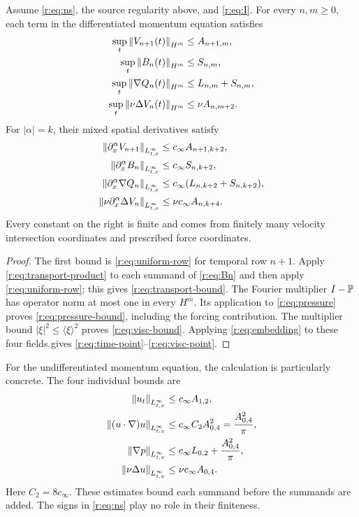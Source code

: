 \begin{theorem}\label{r:thm:individual}
Assume \eqref{r:eq:ns}, the source regularity above, and \eqref{r:eq:I}.
For every \(n,m\ge0\), each term in the differentiated momentum equation
satisfies
\begin{align}
 \sup_t\left\lVert V_{n+1}(t)\right\rVert_{H^m}&\le A_{n+1,m},\label{r:eq:time-bound}\\
 \sup_t\left\lVert B_n(t)\right\rVert_{H^m}&\le S_{n,m},\label{r:eq:transport-bound}\\
 \sup_t\left\lVert \nabla Q_n(t)\right\rVert_{H^m}&\le L_{n,m}+S_{n,m},\label{r:eq:pressure-bound}\\
 \sup_t\left\lVert \nu\Delta V_n(t)\right\rVert_{H^m}&\le\nu A_{n,m+2}.\label{r:eq:visc-bound}
\end{align}
For \(|\alpha|=k\), their mixed spatial derivatives satisfy
\begin{align}
 \left\lVert \partial_x^\alpha V_{n+1}\right\rVert_{L^\infty_{t,x}}
 &\le c_\infty A_{n+1,k+2},\label{r:eq:time-point}\\
 \left\lVert \partial_x^\alpha B_n\right\rVert_{L^\infty_{t,x}}
 &\le c_\infty S_{n,k+2},\label{r:eq:transport-point}\\
 \left\lVert \partial_x^\alpha\nabla Q_n\right\rVert_{L^\infty_{t,x}}
 &\le c_\infty(L_{n,k+2}+S_{n,k+2}),\label{r:eq:pressure-point}\\
 \left\lVert \nu\partial_x^\alpha\Delta V_n\right\rVert_{L^\infty_{t,x}}
 &\le\nu c_\infty A_{n,k+4}.\label{r:eq:visc-point}
\end{align}
Every constant on the right is finite and comes from finitely many velocity
intersection coordinates and prescribed force coordinates.
\end{theorem}

\begin{proof}
The first bound is \eqref{r:eq:uniform-row} for temporal row \(n+1\).
Apply \eqref{r:eq:transport-product} to each summand of \eqref{r:eq:Bn} and
then apply \eqref{r:eq:uniform-row}; this gives \eqref{r:eq:transport-bound}.
The Fourier multiplier \(I-\mathbb P\) has operator norm at most one in every
\(H^m\). Its application to \eqref{r:eq:pressure} proves
\eqref{r:eq:pressure-bound}, including the forcing contribution.
The multiplier bound \(|\xi|^2\le\langle\xi\rangle^2\) proves
\eqref{r:eq:visc-bound}. Applying \eqref{r:eq:embedding} to these four
fields gives \eqref{r:eq:time-point}--\eqref{r:eq:visc-point}.
\end{proof}

For the undifferentiated momentum equation, the calculation is particularly
concrete. The four individual bounds are
\begin{align*}
 \left\lVert u_t\right\rVert_{L^\infty_{t,x}}&\le c_\infty A_{1,2},\\
 \left\lVert (u\cdot\nabla)u\right\rVert_{L^\infty_{t,x}}
 &\le c_\infty C_2 A_{0,4}^2=\frac{A_{0,4}^2}{\pi},\\
 \left\lVert \nabla p\right\rVert_{L^\infty_{t,x}}
 &\le c_\infty L_{0,2}+\frac{A_{0,4}^2}{\pi},\\
 \left\lVert \nu\Delta u\right\rVert_{L^\infty_{t,x}}
 &\le\nu c_\infty A_{0,4}.
\end{align*}
Here \(C_2=8c_\infty\). These estimates bound each summand before the
summands are added. The signs in \eqref{r:eq:ns} play no role in their
finiteness.


